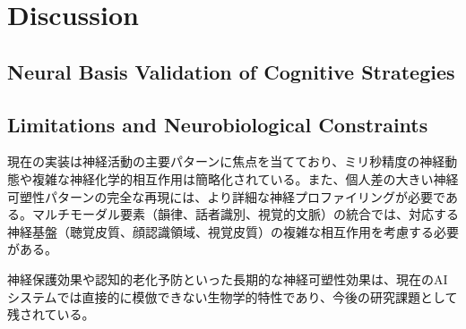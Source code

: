 \section{Discussion}

\subsection{Neural Basis Validation of Cognitive Strategies}

\subsection{Limitations and Neurobiological Constraints}

現在の実装は神経活動の主要パターンに焦点を当てており、ミリ秒精度の神経動態や複雑な神経化学的相互作用は簡略化されている。また、個人差の大きい神経可塑性パターンの完全な再現には、より詳細な神経プロファイリングが必要である。マルチモーダル要素（韻律、話者識別、視覚的文脈）の統合では、対応する神経基盤（聴覚皮質、顔認識領域、視覚皮質）の複雑な相互作用を考慮する必要がある。

神経保護効果や認知的老化予防といった長期的な神経可塑性効果は、現在のAIシステムでは直接的に模倣できない生物学的特性であり、今後の研究課題として残されている。 